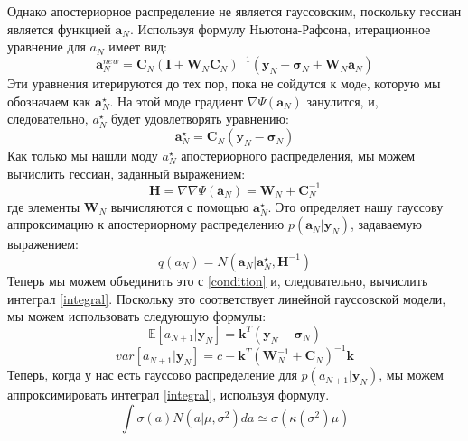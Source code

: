 {Однако апостериорное распределение не является гауссовским, поскольку гессиан является функцией $\mathbf{a}_N$.
Используя формулу Ньютона-Рафсона, итерационное уравнение для $a_N$ имеет вид:
\[
    \mathbf{a}_N^{new} = \mathbf{C}_N(\mathbf{I} + \mathbf{W}_N\mathbf{C}_N)^{-1}(\mathbf{y}_N-\mathbf{\sigma}_N+\mathbf{W}_N\mathbf{a}_N)
\]
Эти уравнения итерируются до тех пор, пока не сойдутся к модe, которую мы обозначаем как $\mathbf{a}_N^{\star}$. На этой моде градиент $\nabla \Psi(\mathbf{a}_N)$ занулится, и, следовательно, $a_N^{\star}$ будет удовлетворять уравнению:
\begin{equation}
    \label{star}
    \mathbf{a}_N^{\star} = \mathbf{C}_N(\mathbf{y}_N - \mathbf{\sigma}_N)
\end{equation}
Как только мы нашли моду $a_N^{\star}$ апостериорного распределения, мы можем вычислить гессиан, заданный выражением:
\[
    \mathbf{H} = \nabla \nabla \Psi(\mathbf{a}_N) = \mathbf{W}_N+\mathbf{C}_N^{-1}
\]
где элементы $\mathbf{W}_N$ вычисляются с помощью $\mathbf{a}_N^{\star}$. Это определяет нашу гауссову аппроксимацию к апостериорному распределению $p(\mathbf{a}_N|\mathbf{y}_N)$, задаваемую выражением:
\[
    q(a_N) = N(\mathbf{a}_N|\mathbf{a}_N^{\star}, \mathbf{H}^{-1})
\]
Теперь мы можем объединить это с \ref{condition} и, следовательно, вычислить интеграл \ref{integral}. Поскольку это соответствует линейной гауссовской модели, мы можем использовать следующую формулы:
\[
    \mathbb{E}[a_{N+1}|\mathbf{y}_N] =\mathbf{k}^T(\mathbf{y}_N - \mathbf{\sigma}_N)
\]
\[
    var[a_{N+1}|\mathbf{y}_N] = c-\mathbf{k}^T(\mathbf{W}_N^{-1} + \mathbf{C}_N)^{-1}\mathbf{k}
\]
Теперь, когда у нас есть гауссово распределение для $p(a_{N+1}|\mathbf{y}_{N})$, мы можем аппроксимировать интеграл \ref{integral}, используя формулу.
\[
    \int \sigma(a)N(a|\mu,\sigma^{2})da\simeq \sigma(\kappa(\sigma^{2})\mu)
\]

}
